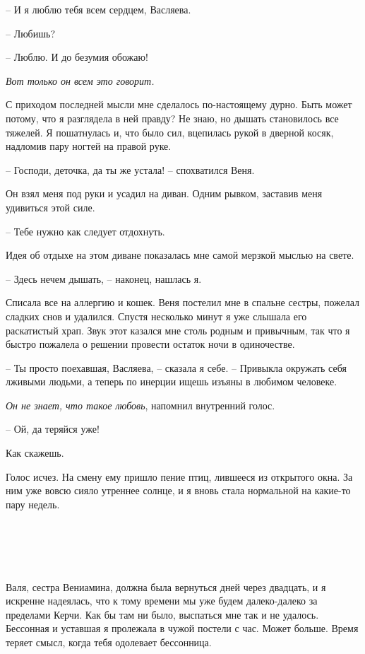 \documentclass[
]{book}
\begin{document}
-- И я люблю тебя всем сердцем, Васляева.

-- Любишь?

-- Люблю. И до безумия обожаю!

\emph{Вот только он всем это говорит.}

С приходом последней мысли мне сделалось по-настоящему дурно. Быть может потому, что я разглядела в ней правду? Не знаю, но дышать становилось все тяжелей. Я пошатнулась и, что было сил, вцепилась рукой в дверной косяк, надломив пару ногтей на правой руке.

-- Господи, деточка, да ты же устала! -- спохватился Веня.

Он взял меня под руки и усадил на диван. Одним рывком, заставив меня удивиться этой силе.

-- Тебе нужно как следует отдохнуть.

Идея об отдыхе на этом диване показалась мне самой мерзкой мыслью на свете.

-- Здесь нечем дышать, -- наконец, нашлась я.

Списала все на аллергию и кошек. Веня постелил мне в спальне сестры, пожелал сладких снов и удалился. Спустя несколько минут я уже слышала его раскатистый храп. Звук этот казался мне столь родным и привычным, так что я быстро пожалела о решении провести остаток ночи в одиночестве.

-- Ты просто поехавшая, Васляева, -- сказала я себе. -- Привыкла окружать себя лживыми людьми, а теперь по инерции ищешь изъяны в любимом человеке.

\emph{Он не знает, что такое любовь}, напомнил внутренний голос.

-- Ой, да теряйся уже!

Как скажешь.

Голос исчез. На смену ему пришло пение птиц, лившееся из открытого окна. За ним уже вовсю сияло утреннее солнце, и я вновь стала нормальной на какие-то пару недель.

\hypertarget{chapter-63}{%
\chapter{~}\label{chapter-63}}

Валя, сестра Вениамина, должна была вернуться дней через двадцать, и я искренне надеялась, что к тому времени мы уже будем далеко-далеко за пределами Керчи. Как бы там ни было, выспаться мне так и не удалось. Бессонная и уставшая я пролежала в чужой постели с час. Может больше. Время теряет смысл, когда тебя одолевает бессонница.
\end{document}
